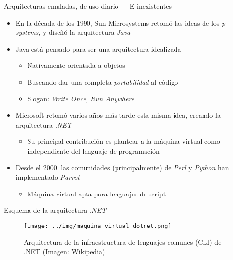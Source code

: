 \documentclass[presentation]{beamer}
\begin{document}
\begin{frame}[label={sec:orgb79cb1b}]{Arquitecturas emuladas, de uso diario — E inexistentes}
\begin{itemize}
\item En la década de los 1990, Sun Microsystems retomó las ideas de los
\emph{p-systems}, y diseñó la arquitectura \emph{Java}
\item Java está pensado para ser una arquitectura idealizada
\begin{itemize}
\item Nativamente orientada a objetos
\item Buscando dar una completa \emph{portabilidad} al código
\item Slogan: \emph{Write Once, Run Anywhere}
\end{itemize}
\item Microsoft retomó varios años más tarde esta misma idea, creando la
arquitectura \emph{.NET}
\begin{itemize}
\item Su principal contribución es plantear a la máquina virtual como
independiente del lenguaje de programación
\end{itemize}
\item Desde el 2000, las comunidades (principalmente) de \emph{Perl} y \emph{Python}
han implementado \emph{Parrot}
\begin{itemize}
\item Máquina virtual apta para lenguajes de script
\end{itemize}
\end{itemize}
\end{frame}

\begin{frame}[label={sec:orgf2545bd}]{Esquema de la arquitectura \emph{.NET}}
\begin{figure}[htbp]
\centering
\texttt{[image: ../img/maquina\_virtual\_dotnet.png]}
\caption{Arquitectura de la infraestructura de lenguajes comunes (CLI) de .NET (Imagen: Wikipedia)}
\end{figure}
\end{frame}
\end{document}
